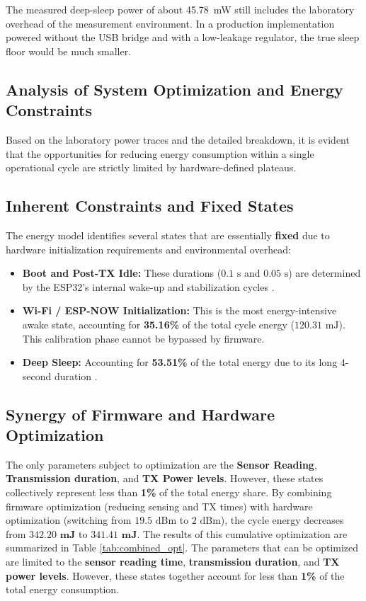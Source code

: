 \documentclass[11pt,a4paper]{article}
\begin{document}
The measured deep-sleep power of about \SI{45.78}{mW} still includes the laboratory overhead of the measurement environment. In a production implementation powered without the USB bridge and with a low-leakage regulator, the true sleep floor would be much smaller.

\subsection{Analysis of System Optimization and Energy Constraints}

Based on the laboratory power traces and the detailed breakdown, it is evident that the opportunities for reducing energy consumption within a single operational cycle are strictly limited by hardware-defined plateaus.

\subsection{Inherent Constraints and Fixed States}
The energy model identifies several states that are essentially \textbf{fixed} due to hardware initialization requirements and environmental overhead:
\begin{itemize}
    \item \textbf{Boot and Post-TX Idle:} These durations ($0.1\text{ s}$ and $0.05\text{ s}$) are determined by the ESP32's internal wake-up and stabilization cycles .
    \item \textbf{Wi-Fi / ESP-NOW Initialization:} This is the most energy-intensive awake state, accounting for \textbf{35.16\%} of the total cycle energy ($120.31\text{ mJ}$). This calibration phase cannot be bypassed by firmware.
    \item \textbf{Deep Sleep:} Accounting for \textbf{53.51\%} of the total energy due to its long $4$-second duration .
\end{itemize}

\subsection{Synergy of Firmware and Hardware Optimization}
The only parameters subject to optimization are the \textbf{Sensor Reading}, \textbf{Transmission duration}, and \textbf{TX Power levels}. However, these states collectively represent less than \textbf{1\%} of the total energy share. 
By combining firmware optimization (reducing sensing and TX times) with hardware optimization (switching from $19.5\text{ dBm}$ to $2\text{ dBm}$), the cycle energy decreases from $\mathbf{342.20\text{ mJ}}$ to $\mathbf{341.41\text{ mJ}}$. The results of this cumulative optimization are summarized in Table \ref{tab:combined_opt}.
The parameters that can be optimized are limited to the \textbf{sensor reading time}, \textbf{transmission duration}, and \textbf{TX power levels}. However, these states together account for less than \textbf{1\%} of the total energy consumption.
\end{document}
